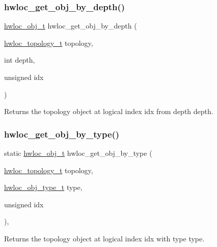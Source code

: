 \subsubsection{\texorpdfstring{hwloc\+\_\+get\+\_\+obj\+\_\+by\+\_\+depth()}{hwloc\_get\_obj\_by\_depth()}}
{\footnotesize\ttfamily \hyperlink{a00185_ga79b8ab56877ef99ac59b833203391c7d}{hwloc\+\_\+obj\+\_\+t} hwloc\+\_\+get\+\_\+obj\+\_\+by\+\_\+depth (\begin{DoxyParamCaption}\item[{\hyperlink{a00186_ga9d1e76ee15a7dee158b786c30b6a6e38}{hwloc\+\_\+topology\+\_\+t}}]{topology,  }\item[{int}]{depth,  }\item[{unsigned}]{idx }\end{DoxyParamCaption})}



Returns the topology object at logical index {\ttfamily idx} from depth {\ttfamily depth}. 

\mbox{\label{a00187_ga6f414dd80a2b943967a0ac92da3181a2}} 
\subsubsection{\texorpdfstring{hwloc\+\_\+get\+\_\+obj\+\_\+by\+\_\+type()}{hwloc\_get\_obj\_by\_type()}}
{\footnotesize\ttfamily static \hyperlink{a00185_ga79b8ab56877ef99ac59b833203391c7d}{hwloc\+\_\+obj\+\_\+t} hwloc\+\_\+get\+\_\+obj\+\_\+by\+\_\+type (\begin{DoxyParamCaption}\item[{\hyperlink{a00186_ga9d1e76ee15a7dee158b786c30b6a6e38}{hwloc\+\_\+topology\+\_\+t}}]{topology,  }\item[{\hyperlink{a00184_gacd37bb612667dc437d66bfb175a8dc55}{hwloc\+\_\+obj\+\_\+type\+\_\+t}}]{type,  }\item[{unsigned}]{idx }\end{DoxyParamCaption})\hspace{0.3cm}{\ttfamily [inline]}, {\ttfamily [static]}}



Returns the topology object at logical index {\ttfamily idx} with type {\ttfamily type}. 

